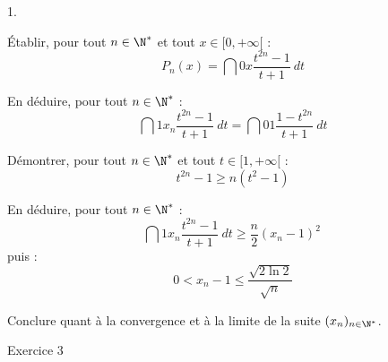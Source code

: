 \documentclass[11pt]{article}%
\begin{document}
\begin{noliste}{1.}
 \setlength{\itemsep}{4mm}
\item Établir, pour tout $n\in \N^{*}$ et tout $x\in [0, + \infty [
$ : 
\[
P_{n}(x) = \dint{0}{x}{\frac{t^{2n}-1}{t + 1}}\ dt 
\]

\item En déduire, pour tout $n\in \N^{*}$ : 
\[
\dint{1}{x_{n}}{\frac{t^{2n}-1}{t + 1}}\ dt =
\dint{0}{1}{\frac{1-t^{2n}}{t + 1}}\ dt 
\]

\item Démontrer, pour tout $n\in \N^{*}$ et tout $t\in
[1, + \infty [$ : 
\[
t^{2n}-1\geq n(t^{2}-1) 
\]

\item En déduire, pour tout $n\in \N^{*}$ : 
\[
\dint{1}{x_{n}}{\frac{t^{2n}-1}{t + 1}}\ dt\geq
{\frac{n}{2}}(x_{n}-1)^{2}\, 
\]
puis : 
\[
0<x_{n}-1\leq {\frac{\sqrt{2\ln 2}}{\sqrt{n}}} 
\]

\item Conclure quant à la convergence et à la limite de la suite
$(x_{n})_{n\in \N^{*}}$.
\end{noliste}

\begin{center}
{\LARGE Exercice 3}
\end{center}
\end{document}
